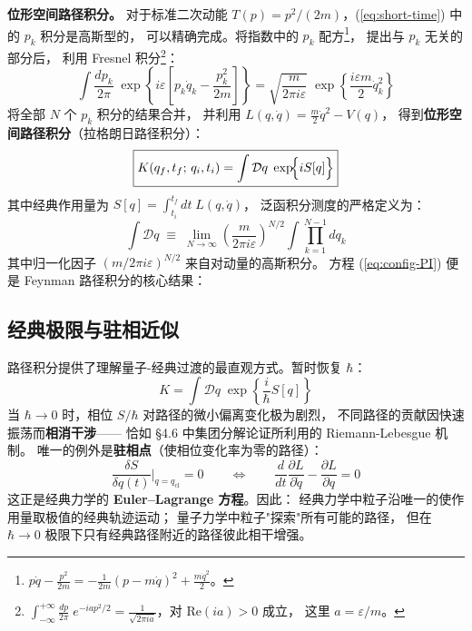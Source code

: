 \vspace{8pt}
\noindent\textbf{位形空间路径积分。}
对于标准二次动能 $T(p) = p^2/(2m)$，(\ref{eq:short-time}) 中的 $p_k$ 积分是高斯型的，
可以精确完成。将指数中的 $p_k$ 配方\footnote{
$p\dot{q} - \frac{p^2}{2m} = -\frac{1}{2m}(p - m\dot{q})^2 + \frac{m\dot{q}^2}{2}$。}，
提出与 $p_k$ 无关的部分后，
利用 Fresnel 积分\footnote{
$\displaystyle\int_{-\infty}^{+\infty}\!\frac{dp}{2\pi}\;e^{-iap^2/2}
= \frac{1}{\sqrt{2\pi ia}}$，对 $\mathrm{Re}(ia) > 0$ 成立，
这里 $a = \varepsilon/m$。}：
\begin{equation}
  \int\frac{dp_k}{2\pi}\;
  \exp\!\left\{i\varepsilon\left[p_k\dot{q}_k - \frac{p_k^2}{2m}\right]\right\}
  = \sqrt{\frac{m}{2\pi i\varepsilon}}\;
    \exp\!\left\{\frac{i\varepsilon m}{2}\dot{q}_k^2\right\}
\end{equation}
将全部 $N$ 个 $p_k$ 积分的结果合并，
并利用 $L(q,\dot{q}) = \frac{m}{2}\dot{q}^2 - V(q)$，
得到\textbf{位形空间路径积分}（拉格朗日路径积分）：
\begin{equation}\label{eq:config-PI}
\boxed{
  K(q_f,t_f;\,q_i,t_i) = \int\mathcal{D}q\;\exp\!\Bigl\{iS[q]\Bigr\}
}
\end{equation}
其中经典作用量为
$S[q] = \int_{t_i}^{t_f}dt\;L(q,\dot{q})$，
泛函积分测度的严格定义为：
\begin{equation}\label{eq:measure}
  \int\mathcal{D}q
  \;\equiv\;
  \lim_{N\to\infty}
  \left(\frac{m}{2\pi i\varepsilon}\right)^{\!N/2}
  \int\prod_{k=1}^{N-1}dq_k
\end{equation}
其中归一化因子 $(m/2\pi i\varepsilon)^{N/2}$ 来自对动量的高斯积分。
方程 (\ref{eq:config-PI}) 便是 Feynman 路径积分的核心结果：
\begin{center}
\end{center}

 
\subsection*{经典极限与驻相近似}

路径积分提供了理解量子-经典过渡的最直观方式。暂时恢复 $\hbar$：
\[
  K = \int\mathcal{D}q\;\exp\!\left\{\frac{i}{\hbar}S[q]\right\}
\]
当 $\hbar \to 0$ 时，相位 $S/\hbar$ 对路径的微小偏离变化极为剧烈，
不同路径的贡献因快速振荡而\textbf{相消干涉}——
恰如 \S4.6 中集团分解论证所利用的 Riemann-Lebesgue 机制。
唯一的例外是\textbf{驻相点}（使相位变化率为零的路径）：
\begin{equation}
  \frac{\delta S}{\delta q(t)}\bigg|_{q = q_{\text{cl}}} = 0
  \qquad\Longleftrightarrow\qquad
  \frac{d}{dt}\frac{\partial L}{\partial\dot{q}}
  - \frac{\partial L}{\partial q} = 0
\end{equation}
这正是经典力学的 \textbf{Euler--Lagrange 方程}。因此：
经典力学中粒子沿唯一的使作用量取极值的经典轨迹运动；
量子力学中粒子"探索"所有可能的路径，
但在 $\hbar\to 0$ 极限下只有经典路径附近的路径彼此相干增强。

